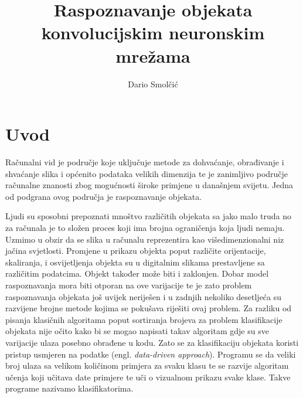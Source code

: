 \documentclass[times, utf8, zavrsni, numeric]{fer}
\begin{document}

\title{Raspoznavanje objekata konvolucijskim neuronskim mrežama}

\author{Dario Smolčić}

\maketitle

\izvornik

\zahvala{}

\tableofcontents

\chapter{Uvod}
Računalni vid je područje koje uključuje metode za dohvaćanje, obrađivanje i shvaćanje slika i općenito podataka velikih dimenzija te je zanimljivo područje računalne znanosti zbog mogućnosti široke primjene u današnjem svijetu. Jedna od podgrana ovog područja je raspoznavanje objekata.

Ljudi su sposobni prepoznati mnoštvo različitih objekata sa jako malo truda no za računala je to složen proces koji ima brojna ograničenja koja ljudi nemaju. Uzmimo u obzir da se slika u računalu reprezentira kao višedimenzionalni niz jačina svjetlosti. Promjene u prikazu objekta poput različite orijentacije, skaliranja, i osvijetljenja objekta su u digitalnim slikama prestavljene sa različitim podatcima. Objekt također može biti i zaklonjen. Dobar model raspoznavanja mora biti otporan na ove varijacije te je zato problem raspoznavanja objekata još uvijek neriješen i u zadnjih nekoliko desetljeća su razvijene brojne metode kojima se pokušava riješiti ovaj problem.
Za razliku od pisanja klasičnih algoritama poput sortiranja brojeva za problem klasifikacije objekata nije očito kako bi se mogao napisati takav algoritam gdje su sve varijacije ulaza posebno obrađene u kodu. Zato se za klasifikaciju objekata koristi pristup usmjeren na podatke (engl. \textit{data-driven approach}). Programu se da veliki broj ulaza sa velikom količinom primjera za svaku klasu te se razvije algoritam učenja koji učitava date primjere te uči o vizualnom prikazu svake klase. Takve programe nazivamo klasifikatorima.
\end{document}
